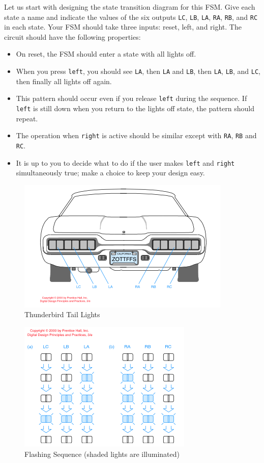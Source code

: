 \documentclass{article}
\begin{document}
Let us start with designing the state transition diagram for this
FSM.  Give each state a name and indicate the values of the six outputs
\verb!LC!, \verb!LB!, \verb!LA!, \verb!RA!, \verb!RB!, and
\verb!RC! in each state. Your FSM should take three
inputs: reset, left, and right. The circuit should have the following
properties:
\begin{itemize}
\item On reset, the FSM should enter a state with all lights off.
\item When you press \verb!left!, you should see
  \verb!LA!, then \verb!LA! and \verb!LB!, then \verb!LA!, \verb!LB!,
  and \verb!LC!, 
then finally all lights off again.
\item This pattern should occur even if you release \verb!left! during the
  sequence. If \verb!left! is still down when you return to the lights off
  state, the pattern should repeat.  
\item The operation when \verb!right! is active should be similar
  except with \verb!RA!, \verb!RB! and \verb!RC!.
\item It is up to you to decide what to do if the user makes \verb!left! and
  \verb!right! simultaneously true; make a choice to keep your design easy.
\end{itemize}
\begin{figure} [h!]
  \centering
  \includegraphics[scale=0.4]{Tbird.png}
  \caption{Thunderbird Tail Lights~\cite{DBLP:books/daglib/0067158}}
  \label{tbird.png}
\end{figure}
\begin{figure} [t!]
  \centering
  \includegraphics[scale=0.35]{tbird_lights.png}
  \caption{Flashing Sequence (shaded lights are illuminated)~\cite{DBLP:books/daglib/0067158}}
  \label{tbird_lights.png}
\end{figure}
\end{document}
